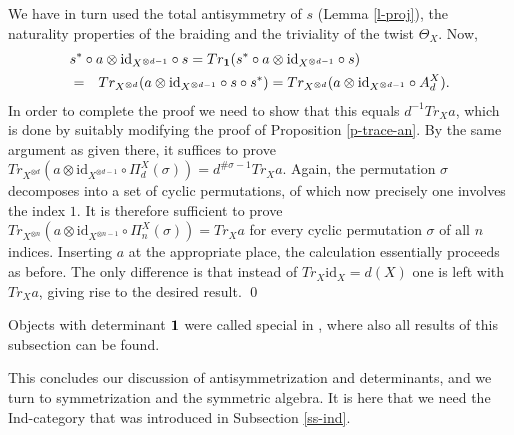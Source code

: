 \documentclass[12pt]{article}
\theoremstyle{definition}
\theoremstyle{definition}
\theoremstyle{remark}
\def\1#1{{\bf #1}}
\def\ol#1{{\overline #1}}
\newcommand{\mcirc}{\circ}
\newcommand{\rarr}{\rightarrow}
\def\id{\mathrm{id}}
\begin{document}
We have in turn used the total antisymmetry of $s$ (Lemma \ref{l-proj}), the naturality properties 
of the braiding and the triviality of the twist $\Theta_X$. Now, 
\begin{eqnarray*} \lefteqn{ s^*\circ a\otimes\id_{X^{\otimes d-1}}\circ s
  = Tr_\11(s^*\circ a\otimes\id_{X^{\otimes d-1}}\circ
  s) } && \\
  &=& Tr_{X^{\otimes d}}(a\otimes\id_{X^{\otimes
      d-1}}\circ s\circ s^*)   
  = Tr_{X^{\otimes d}}(a\otimes\id_{X^{\otimes d-1}}\circ A^X_d).
\end{eqnarray*}
In order to complete the proof we need to show that this equals $d^{-1}Tr_Xa$, which is done by
suitably modifying the proof of Proposition \ref{p-trace-an}. By the same argument as given there,
it suffices to prove 
$Tr_{X^{\otimes d}}(a\otimes\id_{X^{\otimes d-1}}\mcirc \Pi^X_d(\sigma))=d^{\#\sigma -1}Tr_Xa$.
Again, the permutation $\sigma$ decomposes into a set of cyclic permutations, of which now precisely
one involves the index $1$. It is therefore sufficient to prove
$Tr_{X^{\otimes n}}(a\otimes\id_{X^{\otimes n-1}}\mcirc \Pi^X_n(\sigma))=Tr_Xa$ for every cyclic
permutation $\sigma$ of all $n$ indices. Inserting $a$ at the appropriate place, the calculation
essentially proceeds as before. The only difference is that instead of $Tr_X\id_X=d(X)$ one is left
with $Tr_Xa$, giving rise to the desired result.
\qed

\brem Objects with determinant $\11$ were called special in \cite{DR}, where also all results of
this subsection can be found. 
\erem



This concludes our discussion of antisymmetrization  and determinants, and we turn to
symmetrization and the symmetric algebra. It is here that we need the Ind-category that was
introduced in Subsection \ref{ss-ind}.
\end{document}

